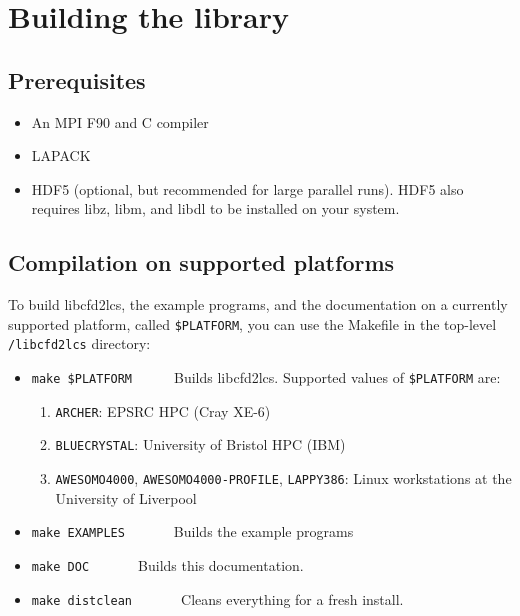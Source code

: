 \documentclass[letterpaper,12pt]{article}
\begin{document}
\section{Building the library}
\subsection*{Prerequisites}
\begin{itemize}
\item An MPI F90 and C compiler
\item LAPACK
\item HDF5 (optional, but recommended for large parallel runs).  HDF5 also requires libz, libm, and libdl to be installed on your system.
\end{itemize}

\subsection*{Compilation on supported platforms}
To build libcfd2lcs, the example programs, and the documentation on a currently supported platform, called \verb|$PLATFORM|, you can use the Makefile in the top-level \verb|/libcfd2lcs| directory:
\begin{itemize}
 \item \verb|make $PLATFORM|~~~~~~Builds libcfd2lcs. Supported values of \verb|$PLATFORM| are:
 \begin{enumerate}
  \item \verb|ARCHER|: EPSRC HPC (Cray XE-6)
  \item \verb|BLUECRYSTAL|:  University of Bristol HPC (IBM)
  \item \verb|AWESOMO4000|, \verb|AWESOMO4000-PROFILE|, \verb|LAPPY386|:  Linux workstations at the University of Liverpool
 \end{enumerate}
 \item \verb|make EXAMPLES|~~~~~~~Builds the example programs
 \item \verb|make DOC|~~~~~~~Builds this documentation.
 \item \verb|make distclean|~~~~~~~Cleans everything for a fresh install.
\end{itemize}
\end{document}
